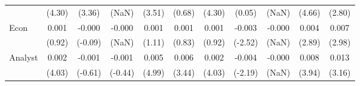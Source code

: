 \begin{table}[H]
{\begin{tabular}{lcccccccccc}
   & (4.30) & (3.36) & (NaN) & (3.51) & (0.68) & (4.30) & (0.05) & (NaN) & (4.66) & (2.80) \\ 
  Econ & 0.001 & -0.000 & -0.000 & 0.001 & 0.001 & 0.001 & -0.003 & -0.000 & 0.004 & 0.007 \\ 
   & (0.92) & (-0.09) & (NaN) & (1.11) & (0.83) & (0.92) & (-2.52) & (NaN) & (2.89) & (2.98) \\ 
  Analyst & 0.002 & -0.001 & -0.001 & 0.005 & 0.006 & 0.002 & -0.004 & -0.000 & 0.008 & 0.013 \\ 
   & (4.03) & (-0.61) & (-0.44) & (4.99) & (3.44) & (4.03) & (-2.19) & (NaN) & (3.94) & (3.16) \\ 
   \hline 
\end{tabular}
}
\end{table}

